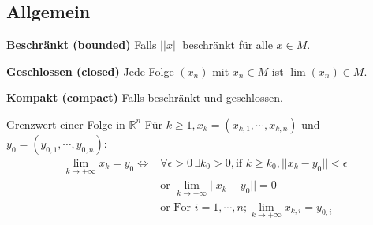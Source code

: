 \subsection{Allgemein}
\textbf{Beschränkt (bounded)} Falls $||x||$ beschränkt für alle $x \in M$.

\textbf{Geschlossen (closed)} Jede Folge $(x_n)$ mit $x_n \in M$ ist $\lim (x_n) \in M$.

\textbf{Kompakt (compact)} Falls beschränkt und geschlossen.

\begin{Definition}{Grenzwert einer Folge in $\mathbb{R}^n$}{}
Für $k\geq1, x_k=(x_{k,1},\cdots,x_{k,n})$ und $y_0 = (y_{0,1}, \cdots, y_{0,n}) $: \\
\begin{align*}    
\boxed{\lim\limits_{k \rightarrow +\infty}{x_k} = y_0} \iff &\forall \epsilon > 0 \, \exists k_0 > 0, \text{if } k \geq k_0, ||x_k - y_0|| < \epsilon\\
&\text{or } \lim\limits_{k \rightarrow +\infty}{||x_k-y_0||} = 0\\
&\text{or For } i=1,\cdots, n; \lim\limits_{k \rightarrow +\infty}{x_{k,i}} = y_{0,i}
\end{align*}

\end{Definition}